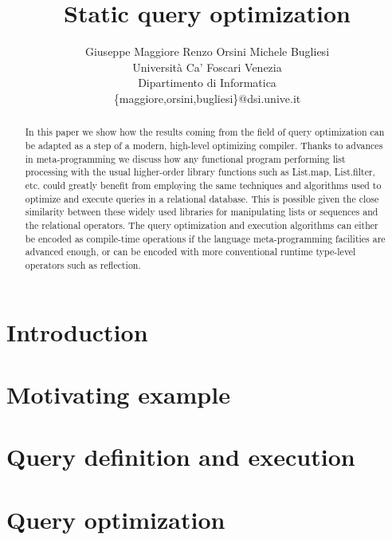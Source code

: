 \documentclass[a4paper]{article}
\begin{document}
\title{\bf Static query optimization}

\author{Giuseppe Maggiore \quad
		  Renzo Orsini
		  Michele Bugliesi
 \\ Universit\`a Ca' Foscari Venezia
 \\ Dipartimento di Informatica 
 \\ \{maggiore,orsini,bugliesi\}@dsi.unive.it
}

\date{}
\maketitle

\begin{abstract}
In this paper we show how the results coming from the field of query optimization can be adapted as a step of a modern, high-level optimizing compiler. Thanks to advances in meta-programming we discuss how any functional program performing list processing with the usual higher-order library functions such as List.map, List.filter, etc. could greatly benefit from employing the same techniques and algorithms used to optimize and execute queries in a relational database. This is possible given the close similarity between these widely used libraries for manipulating lists or sequences and the relational operators. The query optimization and execution algorithms can either be encoded as compile-time operations if the language meta-programming facilities are advanced enough, or can be encoded with more conventional runtime type-level operators such as reflection.
\end{abstract}

\section{Introduction}
\label{sec:intro}
 

\section{Motivating example}
\label{sec:motivating_example}
 

\section{Query definition and execution}
\label{sec:query_definition_and_execution}
 

\section{Query optimization}
\label{sec:query_optimization}
 
\end{document}
